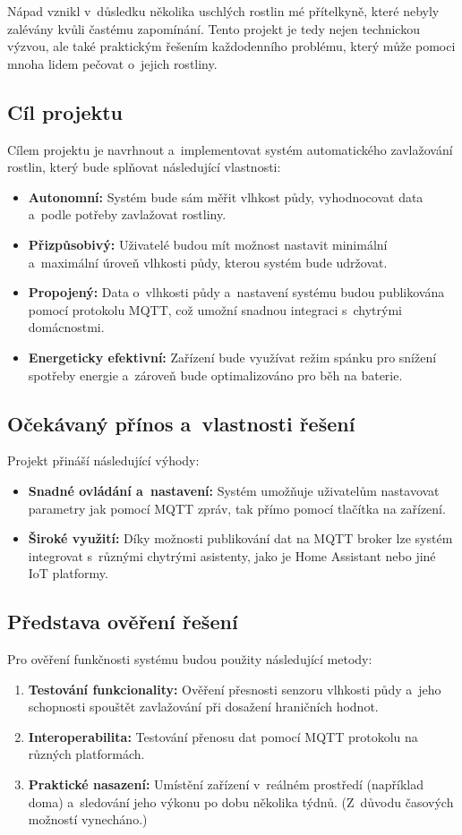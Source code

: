 \documentclass[a4paper, 11pt]{article}
\begin{document}
Nápad vznikl v~důsledku několika uschlých rostlin mé přítelkyně, které nebyly zalévány kvůli častému zapomínání. Tento projekt je tedy nejen technickou výzvou, 
ale také praktickým řešením každodenního problému, který může pomoci mnoha lidem pečovat o~jejich rostliny.

\subsection{Cíl projektu}
Cílem projektu je navrhnout a~implementovat systém automatického zavlažování rostlin, který bude splňovat následující vlastnosti:
\begin{itemize}
    \item \textbf{Autonomní:} Systém bude sám měřit vlhkost půdy, vyhodnocovat data a~podle potřeby zavlažovat rostliny.
    \item \textbf{Přizpůsobivý:} Uživatelé budou mít možnost nastavit minimální a~maximální úroveň vlhkosti půdy, kterou systém bude udržovat.
    \item \textbf{Propojený:} Data o~vlhkosti půdy a~nastavení systému budou publikována pomocí protokolu MQTT, což umožní snadnou integraci s~chytrými domácnostmi.
    \item \textbf{Energeticky efektivní:} Zařízení bude využívat režim spánku pro snížení spotřeby energie a~zároveň bude optimalizováno pro běh na baterie.
\end{itemize}

\subsection{Očekávaný přínos a~vlastnosti řešení}
Projekt přináší následující výhody:
\begin{itemize}
    \item \textbf{Snadné ovládání a~nastavení:} Systém umožňuje uživatelům nastavovat parametry jak pomocí MQTT zpráv, tak přímo pomocí tlačítka na zařízení.
    \item \textbf{Široké využití:} Díky možnosti publikování dat na MQTT broker lze systém integrovat s~různými chytrými asistenty, jako je Home Assistant nebo jiné IoT platformy.
\end{itemize}

\subsection{Představa ověření řešení}
Pro ověření funkčnosti systému budou použity následující metody:
\begin{enumerate}
    \item \textbf{Testování funkcionality:} Ověření přesnosti senzoru vlhkosti půdy a~jeho schopnosti spouštět zavlažování při dosažení hraničních hodnot.
    \item \textbf{Interoperabilita:} Testování přenosu dat pomocí MQTT protokolu na různých platformách.
    \item \textbf{Praktické nasazení:} Umístění zařízení v~reálném prostředí (například doma) a~sledování jeho výkonu po dobu několika týdnů. (Z~důvodu časových možností vynecháno.)
\end{enumerate}
\end{document}
